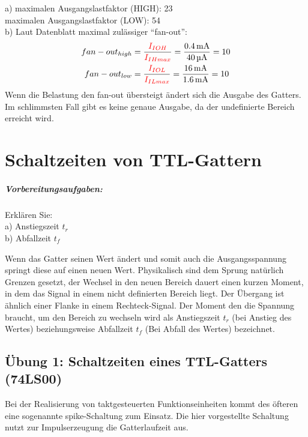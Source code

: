 \documentclass[11pt,a4paper,titlepage]{scrreprt}
\begin{document}
          a)  maximalen Ausgangslastfaktor (HIGH): 23\\
              maximalen Ausgangslastfaktor (LOW): 54\\
          b) Laut Datenblatt maximal zulässiger "`fan-out"':
              \begin{align*}
                  fan-out_{high} &= \frac{\textcolor{red}{I_{IOH}}}{\textcolor{red}{I_{IHmax}}} = \frac{\SI{0,4}{\milli\ampere}}{\SI{40}{\micro\ampere}} = 10\\
                  fan-out_{low} &= \frac{\textcolor{red}{I_{IOL}}}{\textcolor{red}{I_{ILmax}}} = \frac{\SI{16}{\milli\ampere}}{\SI{1,6}{\milli\ampere}} = 10
              \end{align*}
             Wenn die Belastung den fan-out übersteigt ändert sich die Ausgabe des Gatters. Im schlimmsten Fall gibt es keine genaue Ausgabe, da der undefinierte Bereich erreicht wird.
             
  \chapter{Schaltzeiten von TTL-Gattern}
    \paragraph{Vorbereitungsaufgaben:} Erklären Sie:\\a) Anstiegszeit \textbf{$t_r$}\\b) Abfallzeit \textbf{$t_f$}

      Wenn das Gatter seinen Wert ändert und somit auch die Ausgangsspannung springt diese auf einen neuen Wert. Physikalisch sind dem Sprung natürlich Grenzen gesetzt, der Wechsel in den neuen Bereich dauert einen kurzen Moment, in dem das Signal in einem nicht definierten Bereich liegt. Der Übergang ist ähnlich einer Flanke in einem Rechteck-Signal. Der Moment den die Spannung braucht, um den Bereich zu wechseln wird als Anstiegszeit  \textbf{$t_r$} (bei Anstieg des Wertes) beziehungsweise Abfallzeit \textbf{$t_f$} (Bei Abfall des Wertes) bezeichnet.

    \section{Übung 1: Schaltzeiten eines TTL-Gatters (74LS00)}
      Bei der Realisierung von taktgesteuerten Funktionseinheiten kommt des öfteren eine sogenannte spike-Schaltung zum Einsatz. Die hier vorgestellte Schaltung nutzt zur Impulserzeugung die Gatterlaufzeit aus.
        \pagebreak
\end{document}
